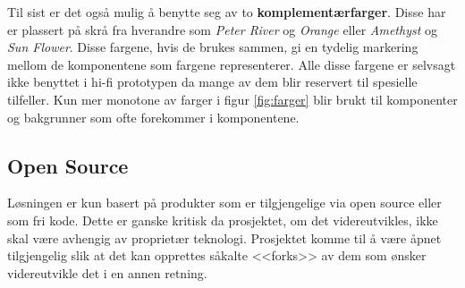 Til sist er det også mulig å benytte seg av to \textbf{komplementærfarger}.
Disse har er plassert på skrå fra hverandre som \emph{Peter River} og \emph{Orange} eller \emph{Amethyst} og \emph{Sun Flower}. Disse fargene, hvis de brukes sammen, gi en tydelig markering mellom de komponentene som fargene representerer. 
Alle disse fargene er selvsagt ikke benyttet i hi-fi prototypen da mange av dem blir reservert til spesielle tilfeller. Kun mer monotone av farger i figur \ref{fig:farger} blir brukt til komponenter og bakgrunner som ofte forekommer i komponentene.

\subsection{Open Source}
Løsningen er kun basert på produkter som er tilgjengelige via open source eller som fri kode. Dette er ganske kritisk da prosjektet, om det videreutvikles, ikke skal være avhengig av proprietær teknologi.
Prosjektet komme til å være åpnet tilgjengelig slik at det kan opprettes såkalte <<forks>> av dem som ønsker videreutvikle det i en annen retning.